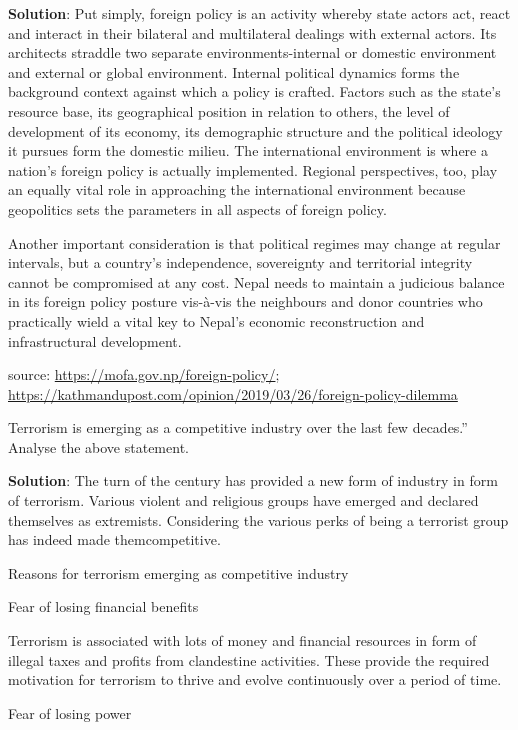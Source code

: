 \documentclass[
  openany]{book}
\newcommand{\question}{\item}
\newenvironment{solution}{ {\bfseries Solution}:}{}
\begin{document}
\begin{questions}
\begin{solution}
Put simply, foreign policy is an activity whereby state actors act, react and interact in their bilateral and multilateral dealings with external actors. Its architects straddle two separate environments-internal or domestic environment and external or global environment. Internal political dynamics forms the background context against which a policy is crafted. Factors such as the state's resource base, its geographical position in relation to others, the level of development of its economy, its demographic structure and the political ideology it pursues form the domestic milieu. The international environment is where a nation's foreign policy is actually implemented. Regional perspectives, too, play an equally vital role in approaching the international environment because geopolitics sets the parameters in all aspects of foreign policy. 

Another important consideration is that political regimes may change at regular intervals, but a country’s independence, sovereignty and territorial integrity cannot be compromised at any cost. Nepal needs to maintain a judicious balance in its foreign policy posture vis-à-vis the neighbours and donor countries who practically wield a vital key to Nepal’s economic reconstruction and infrastructural development.

source: \url{https://mofa.gov.np/foreign-policy/}; \url{https://kathmandupost.com/opinion/2019/03/26/foreign-policy-dilemma}
\end{solution}

\question Terrorism is emerging as a competitive industry over the last few decades.”  Analyse the above statement.

\begin{solution}
The turn of the century has provided a new form of industry in form of terrorism. Various violent and religious groups have emerged and declared themselves as extremists. Considering the various perks of being a terrorist group has indeed made themcompetitive.

Reasons for terrorism emerging as competitive industry

Fear of losing financial benefits

Terrorism is associated with lots of money and financial resources in form of illegal taxes and profits from clandestine activities. These provide the required motivation for terrorism to thrive and evolve continuously over a period of time.

Fear of losing power


\end{solution}
\end{questions}
\end{document}
